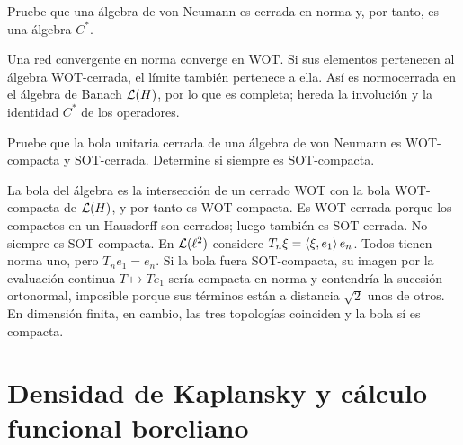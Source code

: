 \begin{ejercicio}\label{ej:v3-l32-3}
Pruebe que una álgebra de von Neumann es cerrada en norma y, por tanto, es una álgebra $C^*$.
\end{ejercicio}
\begin{solucion}
Una red convergente en norma converge en WOT. Si sus elementos pertenecen al álgebra WOT-cerrada, el límite también pertenece a ella. Así es normocerrada en el álgebra de Banach $\mathcal L(H)$, por lo que es completa; hereda la involución y la identidad $C^*$ de los operadores.
\end{solucion}

\begin{ejercicio}\label{ej:v3-l32-4}
Pruebe que la bola unitaria cerrada de una álgebra de von Neumann es WOT-compacta y SOT-cerrada. Determine si siempre es SOT-compacta.
\end{ejercicio}
\begin{solucion}
La bola del álgebra es la intersección de un cerrado WOT con la bola WOT-compacta de $\mathcal L(H)$, y por tanto es WOT-compacta. Es WOT-cerrada porque los compactos en un Hausdorff son cerrados; luego también es SOT-cerrada. No siempre es SOT-compacta. En $\mathcal L(\ell^2)$ considere $T_n\xi=\left\langle\xi,e_1\right\rangle e_n$. Todos tienen norma uno, pero $T_ne_1=e_n$. Si la bola fuera SOT-compacta, su imagen por la evaluación continua $T\mapsto Te_1$ sería compacta en norma y contendría la sucesión ortonormal, imposible porque sus términos están a distancia $\sqrt2$ unos de otros. En dimensión finita, en cambio, las tres topologías coinciden y la bola sí es compacta.
\end{solucion}

\chapter{Densidad de Kaplansky y cálculo funcional boreliano}

